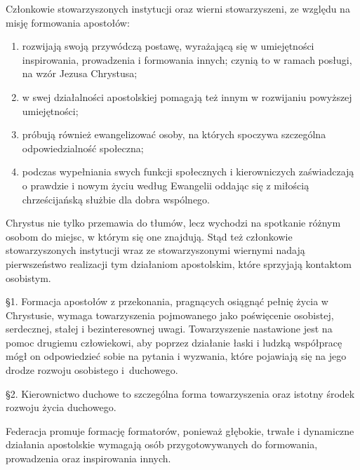 

 Członkowie stowarzyszonych instytucji oraz wierni stowarzyszeni, ze względu na misję formowania apostołów:


\begin{enumerate}


\item rozwijają swoją przywódczą postawę, wyrażającą się w umiejętności inspirowania, prowadzenia i formowania innych; czynią to w ramach posługi, na wzór Jezusa Chrystusa;


\item w swej działalności apostolskiej pomagają też innym w rozwijaniu powyższej umiejętności;


\item próbują również ewangelizować osoby, na których spoczywa szczególna odpowiedzialność społeczna;


\item podczas wypełniania swych funkcji społecznych i kierowniczych zaświadczają o prawdzie i nowym życiu według Ewangelii oddając się z miłością chrześcijańską służbie dla dobra wspólnego. 


\end{enumerate}
 
 
 Chrystus nie tylko przemawia do tłumów, lecz wychodzi na spotkanie różnym osobom do miejsc, w którym się one znajdują. Stąd też członkowie stowarzyszonych instytucji wraz ze stowarzyszonymi wiernymi nadają pierwszeństwo realizacji tym działaniom  apostolskim, które sprzyjają kontaktom osobistym.




 \S{}1. Formacja apostołów z przekonania, pragnących osiągnąć pełnię życia w Chrystusie, wymaga towarzyszenia pojmowanego jako poświęcenie osobistej, serdecznej, stałej i bezinteresownej uwagi. Towarzyszenie nastawione jest na pomoc drugiemu człowiekowi, aby poprzez działanie łaski i ludzką współpracę mógł on odpowiedzieć sobie na pytania i wyzwania, które pojawiają się na jego drodze rozwoju osobistego \mbox{i duchowego}.


\S{}2. Kierownictwo duchowe to szczególna forma towarzyszenia oraz istotny środek rozwoju życia duchowego.
 
 
 Federacja promuje formację formatorów, ponieważ głębokie, trwałe i dynamiczne działania apostolskie wymagają osób przygotowywanych do formowania, prowadzenia oraz inspirowania innych.
 
